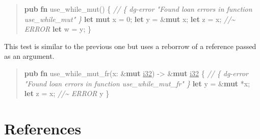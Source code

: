 \documentclass[
  11pt,
  twoside,symmetric]{report}
\newenvironment{Shaded}{}{}
\newcommand{\CommentTok}[1]{\textit{#1}}
\newcommand{\DataTypeTok}[1]{\underline{#1}}
\newcommand{\DecValTok}[1]{#1}
\newcommand{\KeywordTok}[1]{\textbf{#1}}
\newcommand{\NormalTok}[1]{#1}
\newcommand{\OperatorTok}[1]{#1}
\begin{document}
\begin{quote}
\begin{Shaded}
\begin{Highlighting}[]
\KeywordTok{pub} \KeywordTok{fn}\NormalTok{ use\_while\_mut() }\OperatorTok{\{}
    \CommentTok{// \{ dg{-}error "Found loan errors in function use\_while\_mut" \}}
    \KeywordTok{let} \KeywordTok{mut}\NormalTok{ x }\OperatorTok{=} \DecValTok{0}\OperatorTok{;}
    \KeywordTok{let}\NormalTok{ y }\OperatorTok{=} \OperatorTok{\&}\KeywordTok{mut}\NormalTok{ x}\OperatorTok{;}
    \KeywordTok{let}\NormalTok{ z }\OperatorTok{=}\NormalTok{ x}\OperatorTok{;} \CommentTok{//\textasciitilde{} ERROR}
    \KeywordTok{let}\NormalTok{ w }\OperatorTok{=}\NormalTok{ y}\OperatorTok{;}
\OperatorTok{\}}
\end{Highlighting}
\end{Shaded}
\end{quote}

This test is similar to the previous one but uses a reborrow of a
reference passed as an argument.

\begin{quote}
\begin{Shaded}
\begin{Highlighting}[]
\KeywordTok{pub} \KeywordTok{fn}\NormalTok{ use\_while\_mut\_fr(x}\OperatorTok{:} \OperatorTok{\&}\KeywordTok{mut} \DataTypeTok{i32}\NormalTok{) }\OperatorTok{{-}\textgreater{}} \OperatorTok{\&}\KeywordTok{mut} \DataTypeTok{i32} \OperatorTok{\{} 
    \CommentTok{// \{ dg{-}error "Found loan errors in function use\_while\_mut\_fr" \}}
    \KeywordTok{let}\NormalTok{ y }\OperatorTok{=} \OperatorTok{\&}\KeywordTok{mut} \OperatorTok{*}\NormalTok{x}\OperatorTok{;}
    \KeywordTok{let}\NormalTok{ z }\OperatorTok{=}\NormalTok{ x}\OperatorTok{;} \CommentTok{//\textasciitilde{} ERROR}
\NormalTok{    y}
\OperatorTok{\}}
\end{Highlighting}
\end{Shaded}
\end{quote}

\hypertarget{references}{%
\chapter{References}\label{references}}
\end{document}
